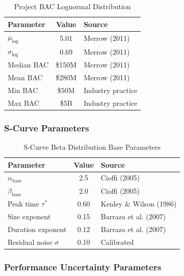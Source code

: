 \begin{table}[h]
\centering
\caption{Project BAC Lognormal Distribution}
\begin{tabular}{lcl}
\toprule
Parameter & Value & Source \\
\midrule
$\mu_{\log}$ & 5.01 & Merrow (2011) \\
$\sigma_{\log}$ & 0.69 & Merrow (2011) \\
Median BAC & \$150M & Merrow (2011) \\
Mean BAC & \$280M & Merrow (2011) \\
Min BAC & \$50M & Industry practice \\
Max BAC & \$5B & Industry practice \\
\bottomrule
\end{tabular}
\end{table}

\subsubsection{S-Curve Parameters}

\begin{table}[h]
\centering
\caption{S-Curve Beta Distribution Base Parameters}
\begin{tabular}{lcl}
\toprule
Parameter & Value & Source \\
\midrule
$\alpha_{\text{base}}$ & 2.5 & Cioffi (2005) \\
$\beta_{\text{base}}$ & 2.0 & Cioffi (2005) \\
Peak time $\tau^*$ & 0.60 & Kenley \& Wilson (1986) \\
Size exponent & 0.15 & Barraza et al. (2007) \\
Duration exponent & 0.12 & Barraza et al. (2007) \\
Residual noise $\sigma$ & 0.10 & Calibrated \\
\bottomrule
\end{tabular}
\end{table}

\subsubsection{Performance Uncertainty Parameters}

